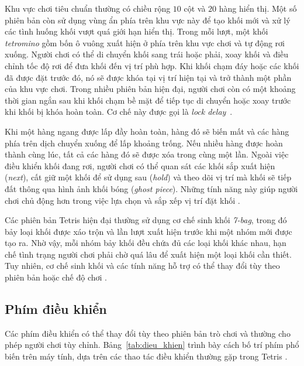 \documentclass[12pt,a4paper,oneside]{report}
\begin{document}
Khu vực chơi tiêu chuẩn thường có chiều rộng $10$ cột và $20$ hàng
hiển thị. Một số phiên bản còn sử dụng vùng ẩn phía trên khu vực
này để tạo khối mới và xử lý các tình huống khối vượt quá giới hạn
hiển thị. Trong mỗi lượt, một khối \textit{tetromino} gồm bốn ô
vuông xuất hiện ở phía trên khu vực chơi và tự động rơi xuống.
Người chơi có thể di chuyển khối sang trái hoặc phải, xoay khối
và điều chỉnh tốc độ rơi để đưa khối đến vị trí phù hợp. Khi khối
chạm đáy hoặc các khối đã được đặt trước đó, nó sẽ được khóa tại
vị trí hiện tại và trở thành một phần của khu vực chơi. Trong nhiều
phiên bản hiện đại, người chơi còn có một khoảng thời gian ngắn
sau khi khối chạm bề mặt để tiếp tục di chuyển hoặc xoay trước
khi khối bị khóa hoàn toàn. Cơ chế này được gọi là
\textit{lock delay}~\cite{tetris_guideline,tetris_lock}.

Khi một hàng ngang được lấp đầy hoàn toàn, hàng đó sẽ biến mất
và các hàng phía trên dịch chuyển xuống để lấp khoảng trống.
Nếu nhiều hàng được hoàn thành cùng lúc, tất cả các hàng đó sẽ
được xóa trong cùng một lần. Ngoài việc điều khiển khối đang
rơi, người chơi có thể quan sát các khối sắp xuất hiện
(\textit{next}), cất giữ một khối để sử dụng sau (\textit{hold})
và theo dõi vị trí mà khối sẽ tiếp đất thông qua hình ảnh khối
bóng (\textit{ghost piece}). Những tính năng này giúp người chơi
chủ động hơn trong việc lựa chọn và sắp xếp vị trí đặt khối
\cite{tetris_guideline}.

Các phiên bản Tetris hiện đại thường sử dụng cơ chế sinh khối
\textit{7-bag}, trong đó bảy loại khối được xáo trộn và lần lượt
xuất hiện trước khi một nhóm mới được tạo ra. Nhờ vậy, mỗi nhóm
bảy khối đều chứa đủ các loại khối khác nhau, hạn chế tình trạng
người chơi phải chờ quá lâu để xuất hiện một loại khối cần thiết.
Tuy nhiên, cơ chế sinh khối và các tính năng hỗ trợ có thể thay
đổi tùy theo phiên bản hoặc chế độ chơi
\cite{tetris_randomizer,tetris_guideline}.

\subsection{Phím điều khiển}

Các phím điều khiển có thể thay đổi tùy theo phiên bản trò chơi
và thường cho phép người chơi tùy chỉnh. Bảng~\ref{tab:dieu_khien}
trình bày cách bố trí phím phổ biến trên máy tính, dựa trên các
thao tác điều khiển thường gặp trong Tetris
\cite{tetris_official,tetris_guideline}.
\end{document}
